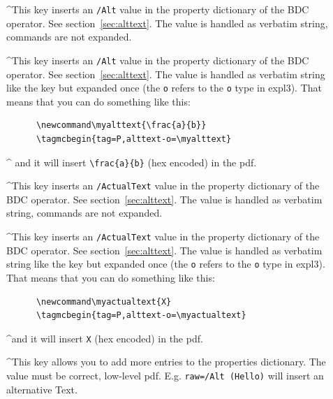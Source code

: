 \documentclass[DIV=12,parskip=half-,bibliography=totoc]{scrartcl}
\begin{document}
\begin{description}
  \item[]
   \TagP^This key inserts an \texttt{/Alt} value in the property dictionary of the BDC operator. See section~\ref{sec:alttext}. The value is handled as verbatim string, commands are not expanded.\Pmeti

  \item[]
  \TagP^This key inserts an \texttt{/Alt} value in the property dictionary of the BDC operator. See section~\ref{sec:alttext}. The value is handled as verbatim string like the key  but expanded once (the \texttt{o} refers to the \texttt{o} type in expl3). That means that you can do something like this:\TagPend

      \begin{lstlisting}
      \newcommand\myalttext{\frac{a}{b}}
      \tagmcbegin{tag=P,alttext-o=\myalttext}
      \end{lstlisting}
  \tagmcend\tagstructend

  \TagP^    and it will insert \verb+\frac{a}{b}+  (hex encoded) in the pdf.\Pmeti

  \item[]
  \TagP^This key inserts an \texttt{/ActualText} value in the property dictionary of the BDC operator. See section~\ref{sec:alttext}. The value is handled as verbatim string, commands are not expanded.\Pmeti

  \item[]
  \TagP^This key inserts an \texttt{/ActualText} value in the property dictionary of the BDC operator. See section~\ref{sec:alttext}. The value is handled as verbatim string like the key  but expanded once (the \texttt{o} refers to the \texttt{o} type in expl3). That means that you can do something like this:\TagPend

      \begin{lstlisting}
      \newcommand\myactualtext{X}
      \tagmcbegin{tag=P,alttext-o=\myactualtext}
      \end{lstlisting}
 \tagmcend\tagstructend


 \TagP^and it will insert \verb+X+ (hex encoded)  in the pdf.\Pmeti

  \item[]
  \TagP^This key allows you to add more entries to the properties dictionary. The value must be correct, low-level pdf. E.g. \verb+raw=/Alt (Hello)+ will insert an alternative Text.\Pmeti
\end{description}
\end{document}
